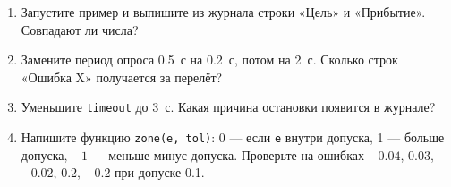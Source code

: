 \begin{taskbox}
\begin{enumerate}
  \item Запустите пример и выпишите из журнала строки «Цель» и «Прибытие». Совпадают ли числа?
  \item Замените период опроса 0.5~с на 0.2~с, потом на 2~с. Сколько строк «Ошибка X» получается за перелёт?
  \item Уменьшите \verb|timeout| до 3~с. Какая причина остановки появится в журнале?
  \item Напишите функцию \verb|zone(e, tol)|: 0 --- если \verb|e| внутри допуска, 1 --- больше допуска, $-1$ --- меньше минус допуска. Проверьте на ошибках $-0.04$, $0.03$, $-0.02$, $0.2$, $-0.2$ при допуске 0.1.
\end{enumerate}
\end{taskbox}
